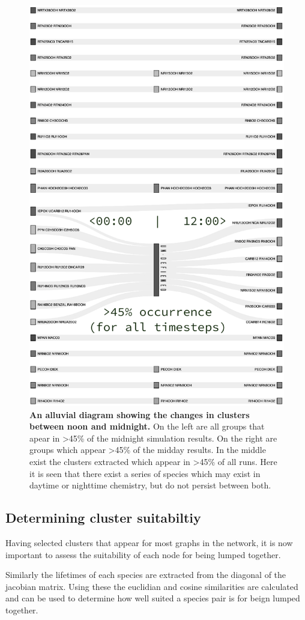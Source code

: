 \begin{figure}[H]
    \centering
\includegraphics[width=.9\textwidth]{fig/alluvial.png}
\caption{\textbf{An alluvial diagram showing the changes in clusters between noon and midnight.} On the left are all groups that apear in >45\% of the midnight simulation results. On the right are groups which appear >45\% of the midday results. In the middle exist the clusters extracted which appear in >45\% of all runs. Here it is seen that there exist a series of species which may exist in daytime or nighttime chemistry, but do not persist between both. }
\label{fig:alluvial}
\end{figure}



\subsection{Determining cluster suitabiltiy}
Having selected clusters that appear for most graphs in the network, it is now important to assess the suitability of each node for being lumped together. 



Similarly the lifetimes of each species are extracted from the diagonal of the jacobian matrix. Using these the euclidian and cosine similarities are calculated and can be used to determine how well suited a species pair is for beign lumped together.
